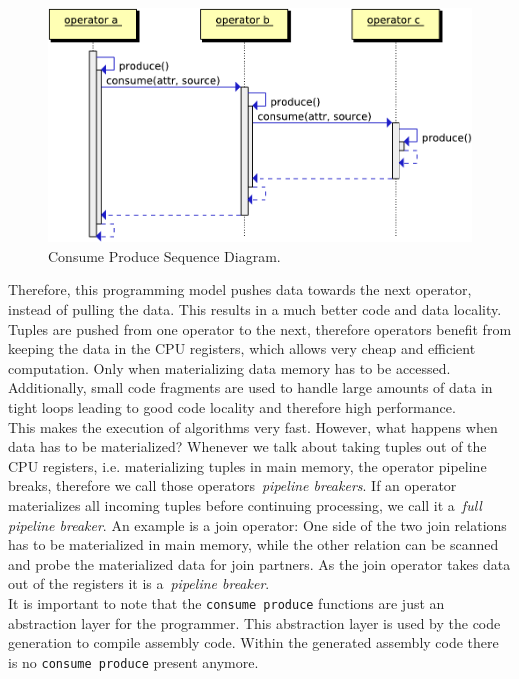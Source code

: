 \begin{figure}[htsb]
  \centerline{
      \includegraphics[scale=0.7]{figures/consume_produce}
  }
  \caption[Consume Produce Sequence Diagram]{Consume Produce Sequence Diagram.}\label{fig:consume_produce_sd}
\end{figure}


Therefore, this programming model pushes data towards the next operator, instead of pulling the data. This results in a much better code and data locality. Tuples are pushed from one operator to the next, therefore operators benefit from keeping the data in the CPU registers, which allows very cheap and efficient computation. Only when materializing data memory has to be accessed. Additionally, small code fragments are used to handle large amounts of data in tight loops leading to good code locality and therefore high performance.
\\
This makes the execution of algorithms very fast. However, what happens when data has to be materialized? Whenever we talk about taking tuples out of the CPU registers, i.e. materializing tuples in main memory, the operator pipeline breaks, therefore we call those operators~\emph{pipeline breakers}. If an operator materializes all incoming tuples before continuing processing, we call it a~\emph{full pipeline breaker}. An example is a join operator: One side of the two join relations has to be materialized in main memory,  while the other relation can be scanned and probe the materialized data for join partners. As the join operator takes data out of the registers it is a~\emph{pipeline breaker}.
\\
It is important to note that the \texttt{consume produce} functions are just an abstraction layer for the programmer. This abstraction layer is used by the code generation to compile assembly code. Within the generated assembly code there is no \texttt{consume produce} present anymore.

